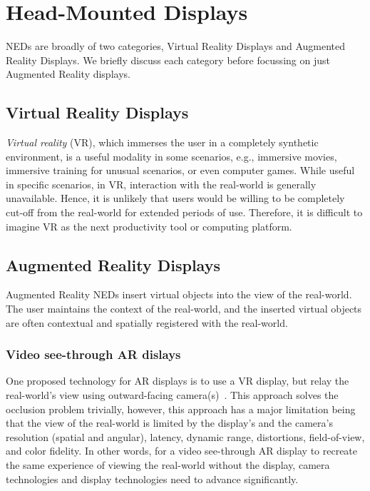 \section{Head-Mounted Displays}
NEDs are broadly of two categories, Virtual Reality Displays and Augmented Reality Displays. 
We briefly discuss each category before focussing on just Augmented Reality displays.

\subsection{Virtual Reality Displays}
\label{sec:background:vr_displays}
\emph{Virtual reality} (VR), which immerses the user in a completely synthetic environment, is a useful modality in some scenarios, e.g., immersive movies, immersive training for unusual scenarios, or even computer games. While useful in specific scenarios, in VR, interaction with the real-world is generally unavailable. 
Hence, it is unlikely that users would be willing to be completely cut-off from the real-world for extended periods of use. 
Therefore, it is difficult to imagine VR as the next productivity tool or computing platform.

\subsection{Augmented Reality Displays}
\label{sec:background:ar_displays}
Augmented Reality NEDs insert virtual objects into the view of the real-world. 
The user maintains the context of the real-world, and the inserted virtual objects are often contextual and spatially registered with the real-world.

\subsubsection{Video see-through AR dislays}
\label{sec:background:vst_displays}
One proposed technology for AR displays is to use a VR display, but relay the real-world’s view using outward-facing camera(s)~\cite{Rolland2000,kanbara2000stereoscopic,state2005simulation}. 
This approach solves the occlusion problem trivially, however, this approach has a major limitation being that the view of the real-world is limited by the display’s and the camera’s resolution (spatial and angular), latency, dynamic range, distortions, field-of-view, and color fidelity. 
In other words, for a video see-through AR display to recreate the same experience of viewing the real-world without the display, camera technologies and display technologies need to advance significantly.


